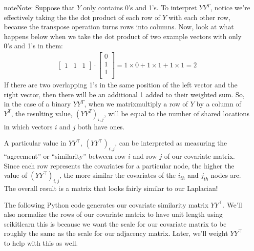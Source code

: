 \documentclass[letterpaper,10pt,english]{jupyterBook}
\begin{document}
\begin{sphinxadmonition}{note}{Note:}
\sphinxAtStartPar
Suppose that \(Y\) only contains 0’s and 1’s. To interpret \(YY^T\), notice we’re effectively taking the the dot product of each row of \(Y\) with each other row, because the transpose operation turns rows into columns. Now, look at what happens below when we take the dot product of two example vectors with only 0’s and 1’s in them:
\label{equation:representations/ch6/joint-representation-learning:7276f209-1403-45e3-a060-ac6cd49c643e}\begin{align}
\begin{bmatrix}
1 & 1 & 1
\end{bmatrix} \cdot 
\begin{bmatrix}
0 \\
1 \\
1 \\
\end{bmatrix} = 1\times 0 + 1\times 1 + 1\times 1 = 2
\end{align}
\sphinxAtStartPar
If there are two overlapping 1’s in the same position of the left vector and the right vector, then there will be an additional 1 added to their weighted sum. So, in the case of a binary \(YY^T\), when we matrix\sphinxhyphen{}multiply a row of \(Y\) by a column of \(Y^T\), the resulting value, \((YY^T)_{i, j}\), will be equal to the number of shared locations in which vectors \(i\) and \(j\) both have ones.
\end{sphinxadmonition}

\sphinxAtStartPar
A particular value in \(YY^\top\), \((YY^\top)_{i, j}\), can be interpreted as measuring the “agreement” or “similarity” between row \(i\) and row \(j\) of our covariate matrix. Since each row represents the covariates for a particular node, the higher the value of \((YY^\top)_{i, j}\), the more similar the covariates of the \(i_{th}\) and \(j_{th}\) nodes are. The overall result is a matrix that looks fairly similar to our Laplacian!

\sphinxAtStartPar
The following Python code generates our covariate similarity matrix \(YY^\top\). We’ll also normalize the rows of our covariate matrix to have unit length using scikit\sphinxhyphen{}learn \sphinxhyphen{} this is because we want the scale for our covariate matrix to be roughly the same as the scale for our adjacency matrix. Later, we’ll weight \(YY^\top\) to help with this as well.

\begin{sphinxVerbatim}[commandchars=\\\{\}]
   

   
  
\end{sphinxVerbatim}
\end{document}
